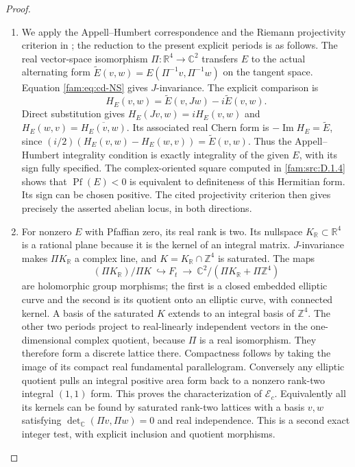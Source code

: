 \begin{proof}
\begin{enumerate}[label=\arabic*.,leftmargin=*]
\item \hypertarget{tag-000G}{}\label{app:rederive:fam-src-D.1.6}
We apply the Appell--Humbert correspondence and the Riemann projectivity
criterion in \cite[Theorem 4.1, p.~1, and Theorem 4.4, p.~3]{Schnell19}; the reduction to the
present explicit periods is as follows. The real vector-space isomorphism
$\Pi:\mathbb R^4\to\mathbb C^2$ transfers $E$ to the actual alternating
form $\widetilde E(v,w)=E(\Pi^{-1}v,\Pi^{-1}w)$ on the tangent space.
Equation \eqref{fam:eq:cd-NS} gives $J$-invariance. The explicit comparison is
\[
 H_E(v,w)=\widetilde E(v,Jw)-i\widetilde E(v,w).
\]
Direct substitution gives $H_E(Jv,w)=iH_E(v,w)$ and
$H_E(w,v)=\overline{H_E(v,w)}$. Its associated real Chern form is
$-\operatorname{Im}H_E=\widetilde E$, since
$(i/2)(H_E(v,w)-H_E(w,v))=\widetilde E(v,w)$.
Thus the Appell--Humbert integrality condition is exactly integrality
of the given $E$, with its sign fully specified. The complex-oriented square computed in \ref{fam:src:D.1.4} shows that
$\operatorname{Pf}(E)<0$ is equivalent to definiteness of this Hermitian
form. Its sign can be chosen positive. The cited projectivity criterion
then gives precisely the asserted abelian locus, in both directions.

\item For nonzero $E$ with Pfaffian zero, its real rank is two. Its nullspace
$K_{\mathbb R}\subset\mathbb R^4$ is a rational plane because it is the
kernel of an integral matrix. $J$-invariance makes $\Pi K_{\mathbb R}$ a
complex line, and $K=K_{\mathbb R}\cap\mathbb Z^4$ is saturated. The maps
\[
 (\Pi K_{\mathbb R})/\Pi K\ \hookrightarrow F_t
 \ \longrightarrow\
 \mathbb C^2/(\Pi K_{\mathbb R}+\Pi\mathbb Z^4)
\]
are holomorphic group morphisms; the first is a closed embedded elliptic
curve and the second is its quotient onto an elliptic curve, with
connected kernel. A basis of the saturated $K$ extends to an integral basis of $\mathbb Z^4$.
The other two periods project to real-linearly independent vectors in the
one-dimensional complex quotient, because $\Pi$ is a real isomorphism.
They therefore form a discrete lattice there. Compactness follows by
taking the image of its compact real fundamental parallelogram. Conversely any elliptic quotient
pulls an integral positive area form back to a nonzero rank-two integral
$(1,1)$ form. This proves the characterization of $\mathcal E_c$.
Equivalently all its kernels can be found by saturated rank-two lattices
with a basis $v,w$ satisfying
$\det_{\mathbb C}(\Pi v,\Pi w)=0$ and real independence. This is a second
exact integer test, with explicit inclusion and quotient morphisms.


\end{enumerate}
\end{proof}
